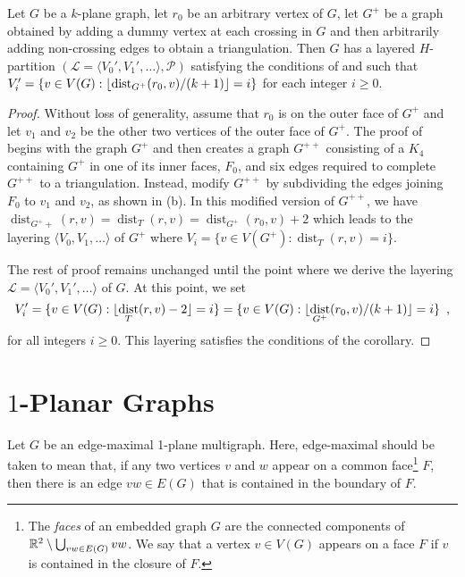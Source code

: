 \documentclass{patmorin}
\DeclareMathOperator{\dist}{dist}
\begin{document}
\begin{cor}
  Let $G$ be a $k$-plane graph, let $r_0$ be an arbitrary vertex of $G$, let $G^+$ be a graph obtained by adding a dummy vertex at each crossing in $G$ and then arbitrarily adding non-crossing edges to obtain a triangulation.  Then $G$ has a layered $H$-partition $(\mathcal{L}=\langle V_0',V_1',\ldots\rangle,\mathcal{P})$ satisfying the conditions of  and such that $V_i' = \{v\in V(G): \floor{\dist_{G^+}(r_0,v)/(k+1)}=i\}$ for each integer $i\ge 0$.
\end{cor}

\begin{proof}
  Without loss of generality, assume that $r_0$ is on the outer face of $G^+$ and let $v_1$ and $v_2$ be the other two vertices of the outer face of $G^+$.
  The proof of  begins with the graph $G^+$ and then creates a graph $G^{++}$ consisting of a $K_4$ containing $G^+$ in one of its inner faces, $F_0$, and six edges required to complete $G^{++}$ to a triangulation.  Instead, modify $G^{++}$ by subdividing the edges joining $F_0$ to $v_1$ and $v_2$, as shown in (b).  In this modified version of $G^{++}$, we have $\dist_{G^++}(r,v)=\dist_{T}(r,v)=\dist_{G^+}(r_0,v)+2$
  which leads to the layering $\langle V_0,V_1,\ldots\rangle$ of $G^+$ where $V_i=\{v\in V(G^+): \dist_{T}(r,v) = i\}$.
  
  The rest of proof remains unchanged until the point where we derive the layering $\mathcal{L}=\langle V_0',V_1',\ldots\rangle$ of $G$.  At this point, we set
  \[  
    V_i' = \{v\in V(G): \floor{\dist_{T}(r,v)-2}=i\} 
         = \{v\in V(G): \floor{\dist_{G^+}(r_0,v)/(k+1)}=i\} \enspace ,
  \]
  for all integers $i\ge 0$.  This layering satisfies the conditions of the corollary.
\end{proof}
  
  
\section{$1$-Planar Graphs}

Let $G$ be an edge-maximal 1-plane multigraph.  Here, edge-maximal should be taken to mean that, if any two vertices $v$ and $w$ appear on a common face\footnote{The \emph{faces} of an embedded graph $G$ are the connected components of $\mathbb{R}^2\setminus \bigcup_{vw\in E(G)} vw$.  We say that a vertex $v\in V(G)$ appears on a face $F$ if $v$ is contained in the closure of $F$.} $F$, then there is an edge $vw\in E(G)$ that is contained in the boundary of $F$.
\end{document}
